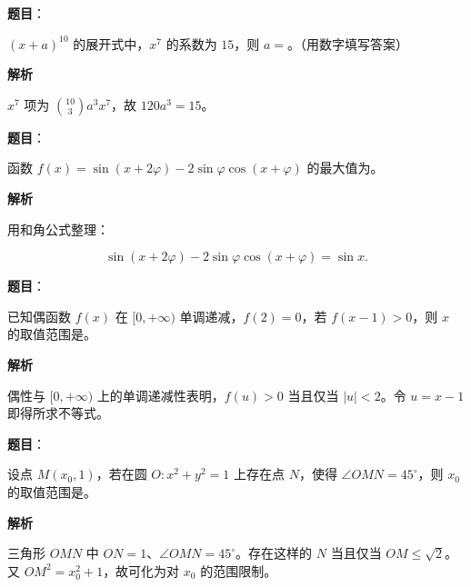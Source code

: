 \begin{answer}

\textbf{题目}：

$(x+a)^{10}$ 的展开式中，$x^7$ 的系数为 $15$，则 $a=$\gkblank{}。（用数字填写答案）

\textbf{解析}

$x^7$ 项为 $\binom{10}{3}a^3x^7$，故 $120a^3=15$。


\end{answer}
\begin{answer}

\textbf{题目}：

函数 $f(x)=\sin(x+2\varphi)-2\sin\varphi\cos(x+\varphi)$ 的最大值为\gkblank{}。

\textbf{解析}

用和角公式整理：

\nopagebreak[4]
\[
\sin(x+2\varphi)-2\sin\varphi\cos(x+\varphi)=\sin x.
\]


\end{answer}
\begin{answer}

\textbf{题目}：

已知偶函数 $f(x)$ 在 $[0,+\infty)$ 单调递减，$f(2)=0$，若 $f(x-1)>0$，则 $x$ 的取值范围是\gkblank{}。

\textbf{解析}

偶性与 $[0,+\infty)$ 上的单调递减性表明，$f(u)>0$ 当且仅当 $|u|<2$。令 $u=x-1$ 即得所求不等式。


\end{answer}
\begin{answer}

\textbf{题目}：

设点 $M(x_0,1)$，若在圆 $O:x^2+y^2=1$ 上存在点 $N$，使得 $\angle OMN=45^\circ$，则 $x_0$ 的取值范围是\gkblank{}。

\textbf{解析}

三角形 $OMN$ 中 $ON=1$、$\angle OMN=45^\circ$。存在这样的 $N$ 当且仅当 $OM\leqslant\sqrt2$。又 $OM^2=x_0^2+1$，故可化为对 $x_0$ 的范围限制。


\end{answer}

